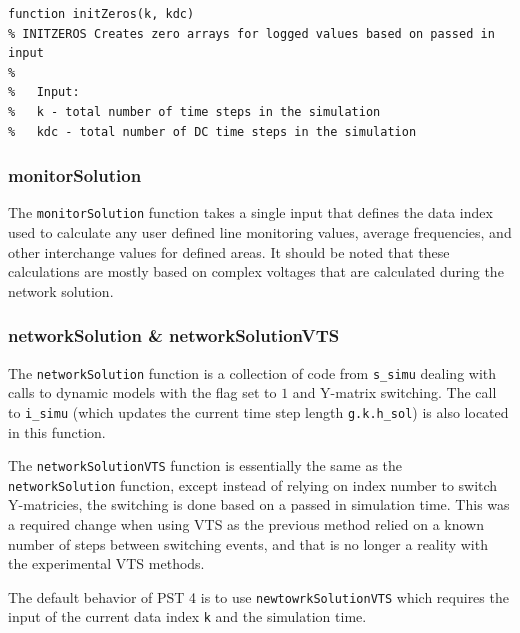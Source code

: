\begin{lstlisting}[caption={Function Header for initZeros},label={lst: initZeros header}]
\end{lstlisting}\vspace{-2 em}
\begin{verbatim}
function initZeros(k, kdc)
% INITZEROS Creates zero arrays for logged values based on passed in input
%
%   Input:
%   k - total number of time steps in the simulation
%   kdc - total number of DC time steps in the simulation
\end{verbatim}

\subsubsection{monitorSolution}  
The \verb|monitorSolution| function takes a single input that defines the data index used to calculate any user defined line monitoring values, average frequencies, and other interchange values for defined areas.
It should be noted that these calculations are mostly based on complex voltages that are calculated during the network solution.

\subsubsection{networkSolution \& networkSolutionVTS}  
The \verb|networkSolution| function is a collection of code from \verb|s_simu| dealing with calls to dynamic models with the flag set to $1$ and Y-matrix switching.
The call to \verb|i_simu| (which updates the current time step length \verb|g.k.h_sol|) is also located in this function.

The \verb|networkSolutionVTS| function is essentially the same as the \verb|networkSolution| function, except instead of relying on index number to switch Y-matricies, the switching is done based on a passed in simulation time.
This was a required change when using VTS as the previous method relied on a known number of steps between switching events, and that is no longer a reality with the experimental VTS methods.

The default behavior of PST 4 is to use \verb|newtowrkSolutionVTS| which requires the input of the current data index \verb|k| and the simulation time.

